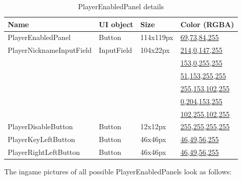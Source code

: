 \newpage
\begin{table}[h!]\centering
	\caption{PlayerEnabledPanel details}
	\begin{tabular}{|C{4cm}|C{4cm}|C{4cm}|C{4cm}|}
		\hline
		\textbf{Name} & \textbf{UI object} & \textbf{Size} & \textbf{Color (RGBA)} \\\hline
		PlayerEnabledPanel & Button & 114x119px & \hyperref[gui-colors]{69,73,84,255} \\\hline
		PlayerNicknameInputField & InputField & 104x22px & \hyperref[gui-colors]{214,0,147,255} \\
		& & & \hyperref[gui-colors]{153,0,255,255} \\
		& & & \hyperref[gui-colors]{51,153,255,255} \\
		& & & \hyperref[gui-colors]{255,153,102,255} \\
		& & & \hyperref[gui-colors]{0,204,153,255} \\
		& & & \hyperref[gui-colors]{102,255,102,255} \\\hline
		PlayerDisableButton & Button & 12x12px & \hyperref[gui-colors]{255,255,255,255} \\\hline
		PlayerKeyLeftButton & Button & 46x46px & \hyperref[gui-colors]{46,49,56,255} \\\hline
		PlayerRightLeftButton & Button & 46x46px & \hyperref[gui-colors]{46,49,56,255} \\\hline
	\end{tabular}
\end{table}

\noindent The ingame pictures of all possible PlayerEnabledPanels look as follows:

